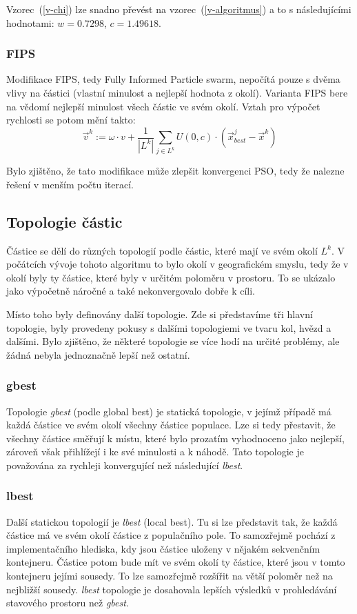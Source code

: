 \documentclass[12pt,a4paper,fleqn]{article}
\begin{document}
Vzorec~(\ref{v-chi}) lze snadno převést na vzorec~(\ref{v-algoritmus}) a to s následujícími hodnotami: $w=0.7298$, $c=1.49618$.

\subsubsection{FIPS}
Modifikace FIPS, tedy Fully Informed Particle swarm, nepočítá pouze s dvěma vlivy na částici (vlastní minulost a nejlepší hodnota z okolí). Varianta FIPS bere na vědomí nejlepší minulost všech částic ve svém okolí. Vztah pro výpočet rychlosti se potom mění takto:
\begin{equation}
\vec{v}^k  :=  \omega \cdot v + \frac{1}{|L^k|} \sum_{j \in L^k} U(0,c) \cdot (\vec{x}^j_{best} - \vec{x}^k)
\end{equation}

Bylo zjištěno, že tato modifikace může zlepšit konvergenci PSO, tedy že nalezne řešení v menším počtu iterací.

\subsection{Topologie částic}
Částice se dělí do různých topologií podle částic, které mají ve svém okolí $L^k$. V počátcích vývoje tohoto algoritmu to bylo okolí v geografickém smyslu, tedy že v okolí byly ty částice, které byly v určitém poloměru v prostoru. To se ukázalo jako výpočetně náročné a také nekonvergovalo dobře k cíli.

Místo toho byly definovány další topologie. Zde si představíme tři hlavní topologie, byly provedeny pokusy s dalšími topologiemi ve tvaru kol, hvězd a dalšími. Bylo zjištěno, že některé topologie se více hodí na určité problémy, ale žádná nebyla jednoznačně lepší než ostatní.

\subsubsection{gbest}
Topologie \textit{gbest} (podle global best) je statická topologie, v jejímž případě má každá částice ve svém okolí všechny částice populace. Lze si tedy přestavit, že všechny částice směřují k místu, které bylo prozatím vyhodnoceno jako nejlepší, zároveň však přihlížejí i ke své minulosti a k náhodě. Tato topologie je považována za rychleji konvergující než následující \textit{lbest}.

\subsubsection{lbest}
Další statickou topologií je \textit{lbest} (local best). Tu si lze představit tak, že každá částice má ve svém okolí částice z populačního pole. To samozřejmě pochází z implementačního hlediska, kdy jsou částice uloženy v nějakém sekvenčním kontejneru. Částice potom bude mít ve svém okolí ty částice, které jsou v tomto kontejneru jejími sousedy. To lze samozřejmě rozšířit na větší poloměr než na nejbližší sousedy. \textit{lbest} topologie je dosahovala lepších výsledků v prohledávání stavového prostoru než \textit{gbest}.
\end{document}
